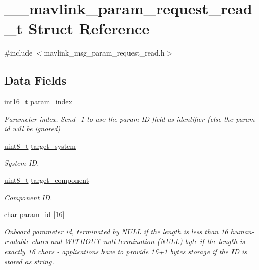 \hypertarget{struct____mavlink__param__request__read__t}{\section{\-\_\-\-\_\-mavlink\-\_\-param\-\_\-request\-\_\-read\-\_\-t Struct Reference}
\label{struct____mavlink__param__request__read__t}
}


{\ttfamily \#include $<$mavlink\-\_\-msg\-\_\-param\-\_\-request\-\_\-read.\-h$>$}

\subsection*{Data Fields}
\begin{DoxyCompactItemize}
\item 
\hyperlink{stdint_8h_aa343fa3b3d06292b959ffdd4c4703b06}{int16\-\_\-t} \hyperlink{struct____mavlink__param__request__read__t_aef0bfa3c1d8457e0b417fa87b31f3c22}{param\-\_\-index}
\begin{DoxyCompactList}\small\item\em Parameter index. Send -\/1 to use the param I\-D field as identifier (else the param id will be ignored) \end{DoxyCompactList}\item 
\hyperlink{stdint_8h_aba7bc1797add20fe3efdf37ced1182c5}{uint8\-\_\-t} \hyperlink{struct____mavlink__param__request__read__t_adc4407f944beba256a385768ea61e588}{target\-\_\-system}
\begin{DoxyCompactList}\small\item\em System I\-D. \end{DoxyCompactList}\item 
\hyperlink{stdint_8h_aba7bc1797add20fe3efdf37ced1182c5}{uint8\-\_\-t} \hyperlink{struct____mavlink__param__request__read__t_aa865f64059877480b11a2f476d1a8ca4}{target\-\_\-component}
\begin{DoxyCompactList}\small\item\em Component I\-D. \end{DoxyCompactList}\item 
char \hyperlink{struct____mavlink__param__request__read__t_aa8ffcf4369a38e0a04cc0252ec13b54e}{param\-\_\-id} \mbox{[}16\mbox{]}
\begin{DoxyCompactList}\small\item\em Onboard parameter id, terminated by N\-U\-L\-L if the length is less than 16 human-\/readable chars and W\-I\-T\-H\-O\-U\-T null termination (N\-U\-L\-L) byte if the length is exactly 16 chars -\/ applications have to provide 16+1 bytes storage if the I\-D is stored as string. \end{DoxyCompactList}\end{DoxyCompactItemize}


